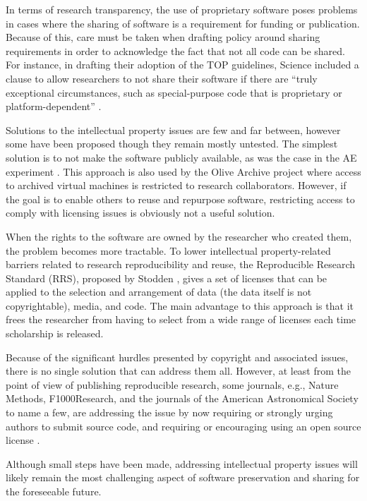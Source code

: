 \documentclass[letterpaper,11pt]{article}
\begin{document}
In terms of research transparency, the use of proprietary software poses problems in cases where the sharing of software is a requirement for funding or publication. Because of this, care must be taken when drafting policy around sharing requirements in order to acknowledge the fact that not all code can be shared. For instance, in drafting their adoption of the TOP guidelines, Science included a clause to allow researchers to not share their software if there are ``truly exceptional circumstances, such as special-purpose code that is proprietary or platform-dependent'' \citep{mcnutt2016}.

Solutions to the intellectual property issues are few and far between, however some have been proposed \citep{mckeehan2016} though they remain mostly untested. The simplest solution is to not make the software publicly available, as was the case in the AE experiment \citep{krishnamurthi2013}. This approach is also used by the Olive Archive project where access to archived virtual machines is restricted to research collaborators. However, if the goal is to enable others to reuse and repurpose software, restricting access to comply with licensing issues is obviously not a useful solution. 

When the rights to the software are owned by the researcher who created them, the problem becomes more tractable. To lower intellectual property-related barriers related to research reproducibility and reuse, the Reproducible Research Standard (RRS), proposed by Stodden \citep{stodden2009}, gives a set of licenses that can be applied to the selection and arrangement of data (the data itself is not copyrightable), media, and code. The main advantage to this approach is that it frees the researcher from having to select from a wide range of licenses each time scholarship is released.

Because of the significant hurdles presented by copyright and associated issues, there is no single solution that can address them all. However, at least from the point of view of publishing reproducible research, some journals, e.g., Nature Methods, F1000Research, and the journals of the American Astronomical Society to name a few, are addressing the issue by now requiring or strongly urging authors to submit source code, and requiring or encouraging using an open source license \citep{evanko2014.ingraham2015,aas2016}. 

Although small steps have been made, addressing intellectual property issues will likely remain the most challenging aspect of software preservation and sharing for the foreseeable future.
\end{document}
